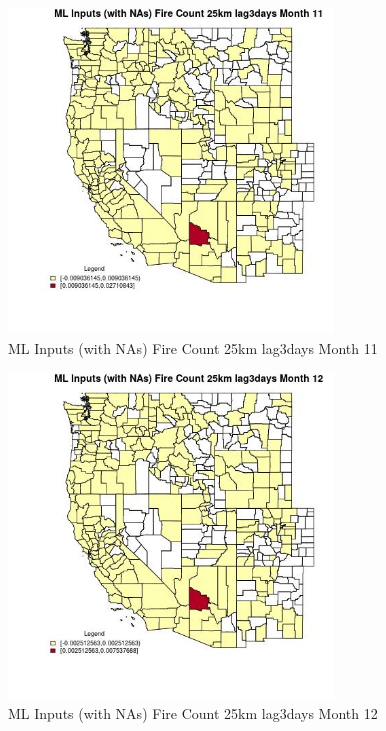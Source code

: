 \begin{figure} 
\centering  
\includegraphics[width=0.77\textwidth]{Code_Outputs/Report_ML_input_PM25_Step4_part_e_de_duplicated_aves_compiled_2019-05-20wNAs_CountyFire_Count_25km_lag3daysmedianMonth11.jpg} 
\caption{\label{fig:Report_ML_input_PM25_Step4_part_e_de_duplicated_aves_compiled_2019-05-20wNAsCountyFire_Count_25km_lag3daysmedianMonth11}ML Inputs (with NAs) Fire Count 25km lag3days Month 11} 
\end{figure} 
 

\begin{figure} 
\centering  
\includegraphics[width=0.77\textwidth]{Code_Outputs/Report_ML_input_PM25_Step4_part_e_de_duplicated_aves_compiled_2019-05-20wNAs_CountyFire_Count_25km_lag3daysmedianMonth12.jpg} 
\caption{\label{fig:Report_ML_input_PM25_Step4_part_e_de_duplicated_aves_compiled_2019-05-20wNAsCountyFire_Count_25km_lag3daysmedianMonth12}ML Inputs (with NAs) Fire Count 25km lag3days Month 12} 
\end{figure} 
 

